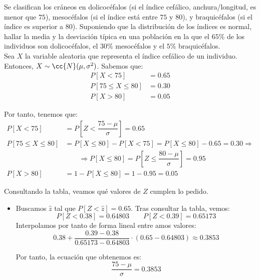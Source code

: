 \begin{ejercicio}
    Se clasifican los cráneos en dolicocéfalos (si el índice cefálico, anchura/longitud, es menor que $75$), mesocéfalos (si el índice está entre $75$ y $80$), y braquicéfalos (si el índice es superior a $80$). Suponiendo que la distribución de los índices es normal, hallar la media y la desviación típica en una población en la que el $65\%$ de los individuos son dolicocéfalos, el $30\%$ mesocéfalos y el $5\%$ braquicéfalos.\\

    Sea $X$ la variable aleatoria que representa el índice cefálico de un individuo.
    Entonces, $X\sim \cc{N}(\mu,\sigma^2)$. Sabemos que:
    \begin{align*}
        P[X<75] &= 0.65\\
        P[75\leq X\leq 80] &= 0.30\\
        P[X>80] &= 0.05
    \end{align*}

    Por tanto, tenemos que:
    \begin{align*}
        P[X<75] &= P\left[Z<\dfrac{75-\mu}{\sigma}\right] = 0.65\\
        P[75\leq X\leq 80] &= P[X\leq 80] - P[X<75] = P[X\leq 80] - 0.65 = 0.30 \Longrightarrow\\
        &\qquad \Longrightarrow P[X\leq 80] = P\left[Z\leq \dfrac{80-\mu}{\sigma}\right] = 0.95 \\
        P[X>80] &= 1-P[X\leq 80] = 1-0.95 = 0.05
    \end{align*}

    Consultando la tabla, veamos qué valores de $Z$ cumplen lo pedido.
    \begin{itemize}
        \item Buscamos $\hat{z}$ tal que $P[Z<\hat{z}] = 0.65$. Tras consultar la tabla, vemos:
        \begin{equation*}
            P[Z<0.38] = 0.64803 \qquad P[Z<0.39] = 0.65173
        \end{equation*}
        Interpolamos por tanto de forma lineal entre amos valores:
        \begin{equation*}
            0.38 + \dfrac{0.39-0.38}{0.65173-0.64803} \cdot (0.65-0.64803) \approx 0.3853
        \end{equation*}

        Por tanto, la ecuación que obtenemos es:
        \begin{equation*}
            \dfrac{75-\mu}{\sigma} = 0.3853
        \end{equation*}


\end{itemize}
\end{ejercicio}
